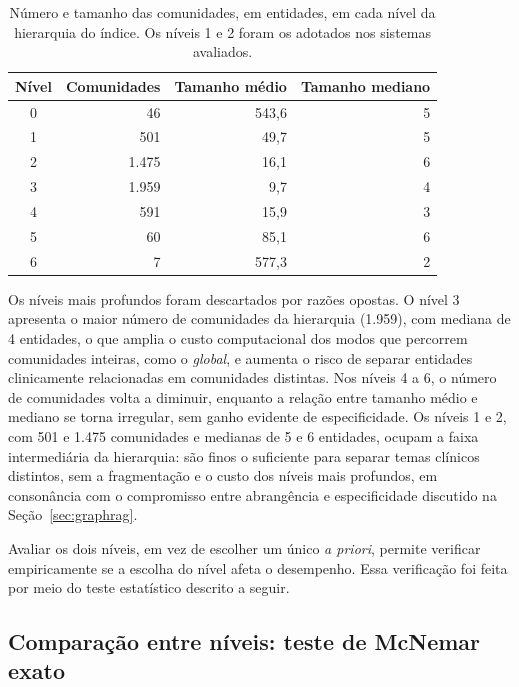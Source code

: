 \begin{table}[!htbp]
\centering
\caption{Número e tamanho das comunidades, em entidades, em cada nível da hierarquia do índice. Os níveis 1 e 2 foram os adotados nos sistemas avaliados.}
\label{tab:met-niveis}
\begin{tabular}{crrr}
\toprule
Nível & Comunidades & Tamanho médio & Tamanho mediano \\
\midrule
0 & 46    & 543,6 & 5 \\
1 & 501   & 49,7  & 5 \\
2 & 1.475 & 16,1  & 6 \\
3 & 1.959 & 9,7   & 4 \\
4 & 591   & 15,9  & 3 \\
5 & 60    & 85,1  & 6 \\
6 & 7     & 577,3 & 2 \\
\bottomrule
\end{tabular}
\par{}
\end{table}

Os níveis mais profundos foram descartados por razões opostas. O nível 3 apresenta o maior número de comunidades da hierarquia (1.959), com mediana de 4 entidades, o que amplia o custo computacional dos modos que percorrem comunidades inteiras, como o \textit{global}, e aumenta o risco de separar entidades clinicamente relacionadas em comunidades distintas. Nos níveis 4 a 6, o número de comunidades volta a diminuir, enquanto a relação entre tamanho médio e mediano se torna irregular, sem ganho evidente de especificidade. Os níveis 1 e 2, com 501 e 1.475 comunidades e medianas de 5 e 6 entidades, ocupam a faixa intermediária da hierarquia: são finos o suficiente para separar temas clínicos distintos, sem a fragmentação e o custo dos níveis mais profundos, em consonância com o compromisso entre abrangência e especificidade discutido na Seção~\ref{sec:graphrag}.

Avaliar os dois níveis, em vez de escolher um único \textit{a priori}, permite verificar empiricamente se a escolha do nível afeta o desempenho. Essa verificação foi feita por meio do teste estatístico descrito a seguir.

\subsection{Comparação entre níveis: teste de McNemar exato}\label{sec:met-mcnemar}

